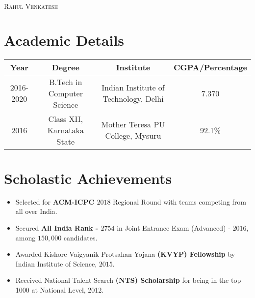 \documentclass{article}
\begin{document}
\begin{center} {\Large \textsc{Rahul Venkatesh}}\end{center}

\section*{Academic Details}
\begin{center} \begin{tabular}{ | c | c | c | c |}
    \hline

    \textbf{Year} &
    \textbf{Degree} &
    \textbf{Institute} &
    \textbf{CGPA/Percentage} \\

    \hline

    2016-2020 &
    B.Tech in Computer Science &
    Indian Institute of Technology, Delhi &
    7.370 \\

    \hline

    2016 &
    Class XII,
    Karnataka State &
    Mother Teresa PU College, Mysuru &
    92.1\% \\

    \hline
\end{tabular} \end{center}

\section*{Scholastic Achievements}
\begin{itemize}[noitemsep,nolistsep]
    \item
        Selected for \textbf{ACM-ICPC $2018$} Regional Round with teams
        competing from all over India.
    \item
        Secured \textbf{All India Rank - $2754$} in Joint Entrance Exam
        (Advanced) - $2016$, among $150,000$ candidates.
    \item
        Awarded Kishore Vaigyanik Protsahan Yojana \textbf{(KVYP) Fellowship} by
        Indian Institute of Science, $2015$.
    \item
        Received National Talent Search \textbf{(NTS) Scholarship} for being
        in the top 1000 at National Level, 2012.
\end{itemize}
\end{document}

